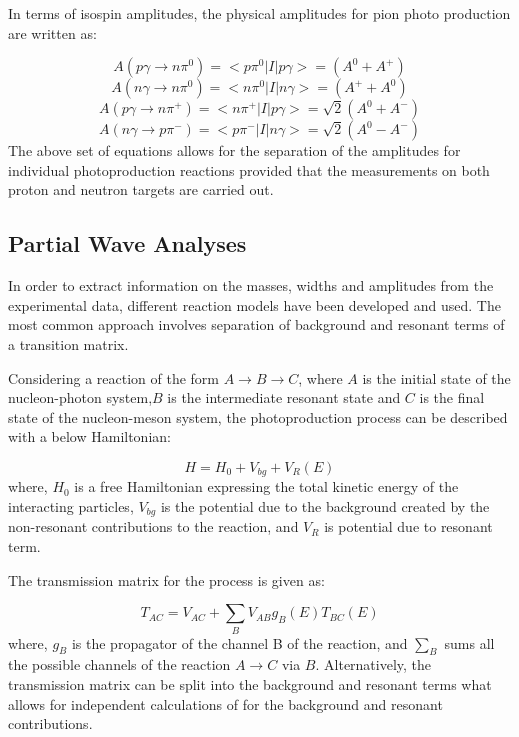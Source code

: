\indent In terms of isospin amplitudes, the physical amplitudes for pion photo production are written as:

\begin{equation}
A(p\gamma \rightarrow n\pi^{0})=<p\pi^{0}|I|p\gamma>=(A^{0}+A^{+})
\end{equation}
\begin{equation}
A(n\gamma \rightarrow n\pi^{0})=<n\pi^{0}|I|n\gamma>=(A^{+}+A^{0})
\end{equation}
\begin{equation}
A(p\gamma \rightarrow n\pi^{+})=<n\pi^{+}|I|p\gamma>=\sqrt{2}(A^{0}+A^{-})
\end{equation}
\begin{equation}
A(n\gamma \rightarrow p\pi^{-})=<p\pi^{-}|I|n\gamma>=\sqrt{2}(A^{0}-A^{-})
\end{equation}
The above set of equations allows for the separation of the amplitudes for individual photoproduction reactions provided that the measurements on both proton and neutron targets are carried out.

\subsection{Partial Wave Analyses}

\indent In order to extract information on the masses, widths and amplitudes from the experimental data, different reaction models have been developed and used. The most common approach involves separation of background and resonant terms of a transition matrix.

\indent Considering a reaction of the form $A\rightarrow B\rightarrow C$, where $A$ is the initial state of the nucleon-photon system,$B$ is the intermediate resonant state and $C$ is the final state of the nucleon-meson system, the photoproduction process can be described with a below Hamiltonian:

\begin{equation}
H=H_{0}+V_{bg}+V_{R}(E)
\end{equation}
where, $H_{0}$ is a free Hamiltonian expressing the total kinetic energy of the interacting particles, $V_{bg}$ is the potential due to the background created by the non-resonant contributions to the reaction, and $V_{R}$ is potential due to resonant term.

\indent The transmission matrix for the process is given as:

\begin{equation}
T_{AC}=V_{AC}+\sum_{B}V_{AB}g_{B}(E)T_{BC}(E)
\end{equation}
where, $g_{B}$ is the propagator of the channel B of the reaction, and $\sum_{B}$ sums all the possible channels of the reaction $A\rightarrow C$ via $B$. Alternatively, the transmission matrix can be split into the background and resonant terms what allows for independent calculations of for the background and resonant contributions.

